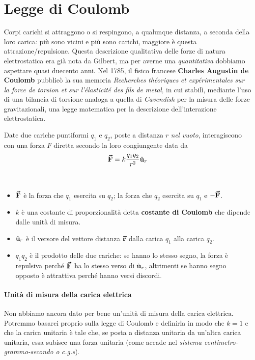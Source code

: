 \section{Legge di Coulomb}
Corpi carichi si attraggono o si respingono, a qualunque distanza, a seconda della loro carica: più sono vicini e più sono carichi, maggiore è questa attrazione/repulsione. Questa descrizione qualitativa delle forze di natura elettrostatica era già nota da Gilbert, ma per averne una \textit{quantitativa} dobbiamo aspettare quasi duecento anni.
Nel 1785, il fisico francese \textbf{Charles Augustin de Coulomb} pubblicò la sua memoria \textit{Recherches théoriques et expérimentales sur la force de torsion et sur l'élasticité des fils de metal}, in cui stabilì, mediante l'uso di una bilancia di torsione analoga a quella di \textit{Cavendish} per la misura delle forze gravitazionali, una legge matematica per la descrizione dell'interazione elettrostatica.
\begin{define}
	Date due cariche puntiformi $q_1$ e $q_2$, poste a distanza $r$ \textit{nel vuoto}, interagiscono con una forza $F$ diretta secondo la loro congiungente data da
	\begin{equation}
		\vb*{\va{F}}=k\frac{q_1q_2}{r^2}\hat{\mathbf{u}}_r\label{leggeCoulomb}
	\end{equation}
\end{define}
\begin{observes}~
	\begin{itemize}
		\item $\vb*{\va{F}}$ è la forza che $q_1$ esercita su $q_2$; la forza che $q_2$ esercita su $q_1$ e $-\vb*{\va{F}}$.
		\item $k$ è una costante di proporzionalità detta \textbf{costante di Coulomb} che dipende dalle unità di misura.
		\item $\hat{\mathbf{u}}_r$ è il versore del vettore distanza $\vb*{\va{r}}$ dalla carica $q_1$ alla carica $q_2$.
		\item $q_1q_2$ è il prodotto delle due cariche: se hanno lo stesso segno, la forza è repulsiva perché $\vb*{\va{F}}$ ha lo stesso verso di $\hat{\mathbf{u}}_r$, altrimenti se hanno segno opposto è attrattiva perché hanno versi discordi.
	\end{itemize}
\end{observes}
\paragraph{Unità di misura della carica elettrica}
Non abbiamo ancora dato per bene un'unità di misura della carica elettrica. Potremmo basarci proprio sulla legge di Coulomb e definirla in modo che $k=1$ e che la carica unitaria è tale che, se posta a distanza unitaria da un'altra carica unitaria, essa subisce una forza unitaria (come accade nel \textit{sistema centimetro-grammo-secondo o c.g.s}).  

